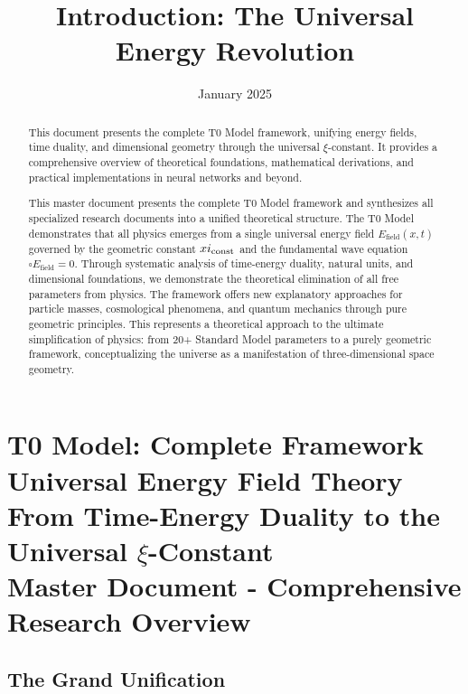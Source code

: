 \documentclass[12pt,a4paper]{report}
\author{}
\date{January 2025}
\begin{document}
\hfuzz=200pt
\allowdisplaybreaks

\chapter{ T0 Model: Complete Framework \\[0.3cm]
	 Universal Energy Field Theory \\[0.3cm]
	 From Time-Energy Duality to the Universal $\xi$-Constant \\[0.5cm]
	 Master Document - Comprehensive Research Overview}

\begin{abstract}
	This document presents the complete T0 Model framework, unifying energy fields, time duality, and dimensional geometry through the universal $\xi$-constant. It provides a comprehensive overview of theoretical foundations, mathematical derivations, and practical implementations in neural networks and beyond.

		This master document presents the complete T0 Model framework and synthesizes all specialized research documents into a unified theoretical structure. The T0 Model demonstrates that all physics emerges from a single universal energy field $E_{\text{field}}(x,t)$ governed by the geometric constant $xi_{\text{const}}$ and the fundamental wave equation $\square E_{\text{field}} = 0$. Through systematic analysis of time-energy duality, natural units, and dimensional foundations, we demonstrate the theoretical elimination of all free parameters from physics. The framework offers new explanatory approaches for particle masses, cosmological phenomena, and quantum mechanics through pure geometric principles. This represents a theoretical approach to the ultimate simplification of physics: from 20+ Standard Model parameters to a purely geometric framework, conceptualizing the universe as a manifestation of three-dimensional space geometry.
	\end{abstract}
	
	\tableofcontents
	\listoftables
	
	\title{Introduction: The Universal Energy Revolution}
\maketitle
	
	\section{The Grand Unification}
	
\end{document}
